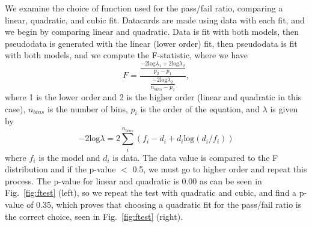 We examine the choice of function used for the pass/fail ratio, comparing a linear, quadratic, and cubic fit. Datacards are made using data with each fit, and we begin by comparing linear and quadratic. Data is fit with both models, then pseudodata is generated with the linear (lower order) fit, then pseudodata is fit with both models, and we compute the F-statistic, where we have
\begin{equation}
F = \frac{\frac{-2\text{log}\lambda_{1} + 2\text{log}\lambda_{2}}{p_{2} - p_{1}}}{\frac{-2\text{log}\lambda_{2}}{n_{bins} - p_{2}}},
\end{equation}
where 1 is the lower order and 2 is the higher order (linear and quadratic in this case), $n_{bins}$ is the number of bins, $p_{i}$ is the order of the equation, and $\lambda$ is given by
\begin{equation}
-2\text{log}\lambda = 2 \sum_{i}^{n_{bins}} (f_{i} - d_{i} + d_{i}\text{log}(d_{i}/f_{i}))
\end{equation}
where $f_{i}$ is the model and $d_{i}$ is data.
The data value is compared to the F distribution and if the p-value $<$ 0.5, we must go to higher order and repeat this process. The p-value for linear and quadratic is 0.00 as can be seen in Fig.~\ref{fig:ftest} (left), so we repeat the test with quadratic and cubic, and find a p-value of 0.35, which proves that choosing a quadratic fit for the pass/fail ratio is the correct choice, seen in Fig.~\ref{fig:ftest} (right).
